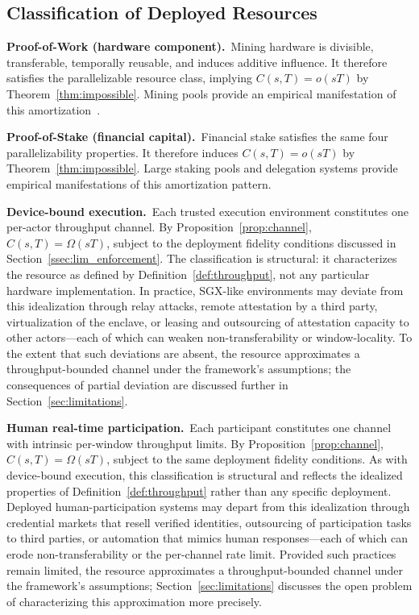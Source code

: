 \documentclass[manuscript,review]{acmart}
\theoremstyle{remark}
\begin{document}
	\subsection{Classification of Deployed Resources}
	\label{ssec:walkthrough}
	
	\noindent\textbf{Proof-of-Work (hardware component).}\ 
	Mining hardware is divisible, transferable,
	temporally reusable, and induces additive influence.
	It therefore satisfies the parallelizable resource
	class, implying $C(s,T) = o(sT)$ by
	Theorem~\ref{thm:impossible}.
	Mining pools provide an empirical manifestation of
	this amortization~\cite{gencer2018decentralization,
		rosenfeld2011analysis}.
	
	\noindent\textbf{Proof-of-Stake (financial capital).}\ 
	Financial stake satisfies the same four
	parallelizability properties.
	It therefore induces $C(s,T) = o(sT)$ by
	Theorem~\ref{thm:impossible}.
	Large staking pools and delegation systems provide
	empirical manifestations of this amortization pattern.
	
	\noindent\textbf{Device-bound execution.}\ 
	Each trusted execution environment constitutes one
	per-actor throughput channel.
	By Proposition~\ref{prop:channel},
	$C(s,T) = \Omega(sT)$, subject to the deployment
	fidelity conditions discussed in
	Section~\ref{ssec:lim_enforcement}.
	The classification is structural: it characterizes
	the resource as defined by
	Definition~\ref{def:throughput}, not any particular
	hardware implementation.
	In practice, SGX-like environments may deviate from
	this idealization through relay attacks, remote
	attestation by a third party, virtualization of the
	enclave, or leasing and outsourcing of attestation
	capacity to other actors---each of which can weaken
	non-transferability or window-locality.
	To the extent that such deviations are absent, the
	resource approximates a throughput-bounded channel
	under the framework's assumptions; the consequences
	of partial deviation are discussed further in
	Section~\ref{sec:limitations}.
	
	\noindent\textbf{Human real-time participation.}\ 
	Each participant constitutes one channel with
	intrinsic per-window throughput limits.
	By Proposition~\ref{prop:channel},
	$C(s,T) = \Omega(sT)$, subject to the same
	deployment fidelity conditions.
	As with device-bound execution, this classification
	is structural and reflects the idealized properties
	of Definition~\ref{def:throughput} rather than any
	specific deployment.
	Deployed human-participation systems may depart from
	this idealization through credential markets that
	resell verified identities, outsourcing of
	participation tasks to third parties, or automation
	that mimics human responses---each of which can
	erode non-transferability or the per-channel rate
	limit.
	Provided such practices remain limited, the resource
	approximates a throughput-bounded channel under the
	framework's assumptions; Section~\ref{sec:limitations}
	discusses the open problem of characterizing this
	approximation more precisely.
	
\end{document}
